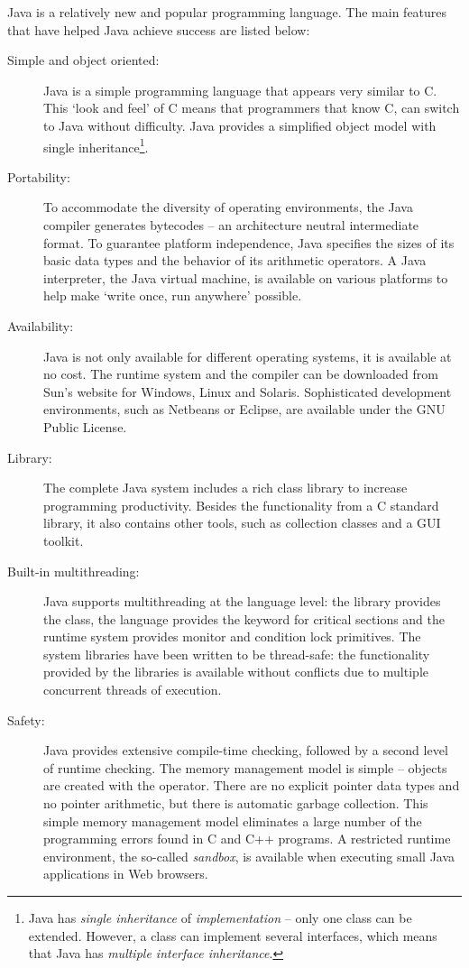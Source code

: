Java is a relatively new and popular programming language. The main
features that have helped Java achieve success are listed below:
%
\begin{description}
    \item[Simple and object oriented:]
Java is a simple programming language that appears very similar to
C. This `look and feel' of C means that programmers that know C, can
switch to Java without difficulty. Java provides a simplified object
model with single inheritance\footnote{Java has \emph{single
inheritance} of \emph{implementation} -- only one class can be
extended. However, a class can implement several interfaces, which
means that Java has \emph{multiple interface inheritance}.}.

    \item[Portability:]
To accommodate the diversity of operating environments, the Java
compiler generates bytecodes -- an architecture neutral intermediate
format. To guarantee platform independence, Java specifies the sizes
of its basic data types and the behavior of its arithmetic
operators. A Java interpreter, the Java virtual machine, is
available on various platforms to help make `write once, run
anywhere' possible.

    \item[Availability:]
Java is not only available for different operating systems, it is
available at no cost. The runtime system and the compiler can be
downloaded from Sun's website for Windows, Linux and Solaris.
Sophisticated development environments, such as Netbeans or Eclipse,
are available under the GNU Public License.

    \item[Library:]
The complete Java system includes a rich class library to increase
programming productivity. Besides the functionality from a C
standard library, it also contains other tools, such as collection
classes and a GUI toolkit.

    \item[Built-in multithreading:]
Java supports multithreading at the language level: the library
provides the  class, the language provides the keyword
 for critical sections and the runtime system
provides monitor and condition lock primitives. The system libraries
have been written to be thread-safe: the functionality provided by
the libraries is available without conflicts due to multiple
concurrent threads of execution.

    \item[Safety:]
Java provides extensive compile-time checking, followed by a second
level of runtime checking. The memory management model is simple --
objects are created with the  operator. There are no
explicit pointer data types and no pointer arithmetic, but there is
automatic garbage collection. This simple memory management model
eliminates a large number of the programming errors found in C and
C++ programs. A restricted runtime environment, the so-called
\emph{sandbox}, is available when executing small Java applications
in Web browsers.

\end{description}
